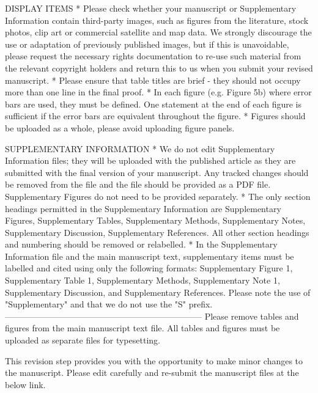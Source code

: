 \documentclass[11pt, a4paper]{letter} %
\begin{document}
DISPLAY ITEMS
* Please check whether your manuscript or Supplementary Information contain third-party images, such as figures from the literature, stock photos, clip art or commercial satellite and map data. We strongly discourage the use or adaptation of previously published images, but if this is unavoidable, please request the necessary rights documentation to re-use such material from the relevant copyright holders and return this to us when you submit your revised manuscript.
* Please ensure that table titles are brief - they should not occupy more than one line in the final proof.
* In each figure (e.g. Figure 5b) where error bars are used, they must be defined. One statement at the end of each figure is sufficient if the error bars are equivalent throughout the figure.
* Figures should be uploaded as a whole, please avoid uploading figure panels.

SUPPLEMENTARY INFORMATION
* We do not edit Supplementary Information files; they will be uploaded with the published article as they are submitted with the final version of your manuscript. Any tracked changes should be removed from the file and the file should be provided as a PDF file. Supplementary Figures do not need to be provided separately.
* The only section headings permitted in the Supplementary Information are Supplementary Figures, Supplementary Tables, Supplementary Methods, Supplementary Notes, Supplementary Discussion, Supplementary References. All other section headings and numbering should be removed or relabelled.
* In the Supplementary Information file and the main manuscript text, supplementary items must be labelled and cited using only the following formats: Supplementary Figure 1, Supplementary Table 1, Supplementary Methods, Supplementary Note 1, Supplementary Discussion, and Supplementary References. Please note the use of "Supplementary" and that we do not use the "S" prefix.
---------------------------------------------------------------------
Please remove tables and figures from the main manuscript text file. All tables and figures must be uploaded as separate files for typesetting.

This revision step provides you with the opportunity to make minor changes to the manuscript. Please edit carefully and re-submit the manuscript files at the below link.
\end{document}
